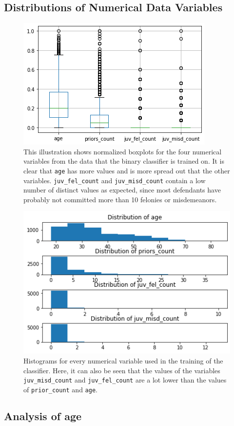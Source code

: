 \documentclass[11pt, fleqn, titlepage]{article}
\begin{document}
	\subsection{Distributions of Numerical Data Variables}
	\begin{figure}
		\centering
		\includegraphics[width=0.5\linewidth]{imgs/boxplot_numericals}
		\caption{This illustration shows normalized boxplots for the four numerical variables from the data that the binary classifier is trained on. It is clear that \texttt{age} has more values and is more spread out that the other variables. \texttt{juv\_fel\_count} and \texttt{juv\_misd\_count} contain a low number of distinct values as expected, since most defendants have probably not committed more than 10 felonies or misdemeanors.}
		\label{fig:boxplotnumericals}
	\end{figure}
	\begin{figure}
		\centering
		\includegraphics[width=0.5\linewidth]{imgs/histogram_numerical}
		\caption{Histograms for every numerical variable used in the training of the classifier. Here, it can also be seen that the values of the variables \texttt{juv\_misd\_count} and \texttt{juv\_fel\_count} are a lot lower than the values of \texttt{prior\_count} and \texttt{age}.}
		\label{fig:histogramnumerical}
	\end{figure}
	

	\subsection{Analysis of age}\label{analysis_of_age}
	
\end{document}
